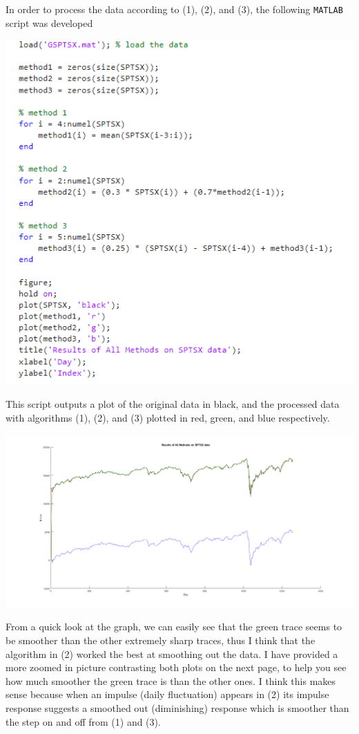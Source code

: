 \documentclass[]{report}
\begin{document}
	In order to process the data according to (1), (2), and (3), the following \texttt{MATLAB} script was developed
	\vspace{1em}
	\begin{center}
		\includegraphics[scale=0.65]{SPTSX Code.png}
	\end{center}
	This script outputs a plot of the original data in black, and the processed data with algorithms (1), (2), and (3) plotted in red, green, and blue respectively.
	\vspace{1em}
	\begin{center}
		\includegraphics[scale=0.3]{SPTSX.png}
	\end{center}
	\vspace{1em}
	From a quick look at the graph, we can easily see that the green trace seems to be smoother than the other extremely sharp traces, thus I think that the algorithm in (2) worked the best at smoothing out the data. I have provided a more zoomed in picture contrasting both plots on the next page, to help you see how much smoother the green trace is than the other ones. I think this makes sense because when an impulse (daily fluctuation) appears in (2) its impulse response suggests a smoothed out (diminishing) response which is smoother than the step on and off from (1) and (3).
	
\end{document}
